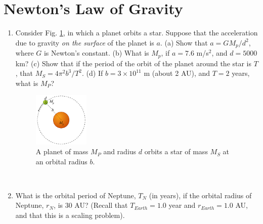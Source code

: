 \documentclass[10pt]{article}
\begin{document}
\section{Newton's Law of Gravity}
\begin{enumerate}
\item Consider Fig. \ref{fig:planet}, in which a planet orbits a star.  Suppose that the acceleration due to gravity \textit{on the surface} of the planet is $a$.  (a) Show that $a = GM_p/d^2$, where $G$ is Newton's constant.  (b)  What is $M_p$, if $a=7.6$ m/s$^2$, and $d = 5000$ km? (c) Show that if the period of the orbit of the planet around the star is $T$, that $M_S = 4\pi^2 b^3/T^2$. (d) If $b = 3 \times 10^{11}$ m (about 2 AU), and $T = 2$ years, what is $M_P$?
\begin{figure}[hb]
\centering
\includegraphics[width=0.25\textwidth]{figures/planet.png}
\caption{\label{fig:planet} A planet of mass $M_P$ and radius $d$ orbits a star of mass $M_S$ at an orbital radius $b$.}
\end{figure} \\ \vspace{0.5cm}
\item What is the orbital period of Neptune, $T_N$ (in years), if the orbital radius of Neptune, $r_N$, is 30 AU? (Recall that $T_{Earth} = 1.0$ year and $r_{Earth} = 1.0$ AU, and that this is a scaling problem). \\ \vspace{1cm}
\end{enumerate}
\end{document}

